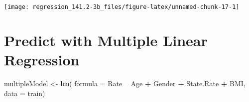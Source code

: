 \documentclass[]{book}
\newenvironment{Shaded}{\begin{snugshade}}{\end{snugshade}}
\newcommand{\CommentTok}[1]{\textcolor[rgb]{0.56,0.35,0.01}{\textit{#1}}}
\newcommand{\DataTypeTok}[1]{\textcolor[rgb]{0.13,0.29,0.53}{#1}}
\newcommand{\DecValTok}[1]{\textcolor[rgb]{0.00,0.00,0.81}{#1}}
\newcommand{\KeywordTok}[1]{\textcolor[rgb]{0.13,0.29,0.53}{\textbf{#1}}}
\newcommand{\NormalTok}[1]{#1}
\newcommand{\OperatorTok}[1]{\textcolor[rgb]{0.81,0.36,0.00}{\textbf{#1}}}
\newcommand{\StringTok}[1]{\textcolor[rgb]{0.31,0.60,0.02}{#1}}
\begin{document}
\begin{Shaded}
\end{Shaded}

\begin{center}\texttt{[image: regression\_141.2-3b\_files/figure-latex/unnamed-chunk-17-1]} \end{center}

\begin{Shaded}
\end{Shaded}

\hypertarget{predict-with-multiple-linear-regression}{%
\section{Predict with Multiple Linear Regression}\label{predict-with-multiple-linear-regression}}

\begin{Shaded}
\begin{Highlighting}[]
\NormalTok{multipleModel <-}\StringTok{ }\KeywordTok{lm}\NormalTok{(}
  \DataTypeTok{formula =}\NormalTok{ Rate }\OperatorTok{~}\StringTok{ }\NormalTok{Age }\OperatorTok{+}\StringTok{ }\NormalTok{Gender }\OperatorTok{+}\StringTok{ }\NormalTok{State.Rate }\OperatorTok{+}\StringTok{ }\NormalTok{BMI,}
  \DataTypeTok{data =}\NormalTok{ train)}
\end{Highlighting}
\end{Shaded}
\end{document}
